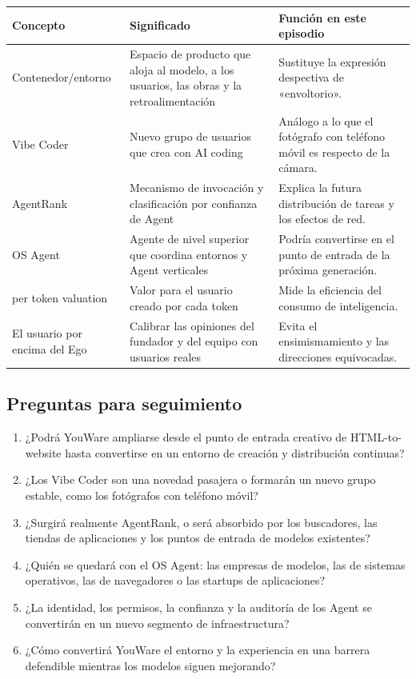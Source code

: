 \noindent\begin{tabularx}{\textwidth}{p{}p{}X}
\toprule
Concepto & Significado & Función en este episodio \\
\midrule
Contenedor/entorno & Espacio de producto que aloja al modelo, a los usuarios, las obras y la retroalimentación & Sustituye la expresión despectiva de «envoltorio». \\
Vibe Coder & Nuevo grupo de usuarios que crea con AI coding & Análogo a lo que el fotógrafo con teléfono móvil es respecto de la cámara. \\
AgentRank & Mecanismo de invocación y clasificación por confianza de Agent & Explica la futura distribución de tareas y los efectos de red. \\
OS Agent & Agente de nivel superior que coordina entornos y Agent verticales & Podría convertirse en el punto de entrada de la próxima generación. \\
per token valuation & Valor para el usuario creado por cada token & Mide la eficiencia del consumo de inteligencia. \\
El usuario por encima del Ego & Calibrar las opiniones del fundador y del equipo con usuarios reales & Evita el ensimismamiento y las direcciones equivocadas. \\
\bottomrule
\end{tabularx}

\subsection{Preguntas para seguimiento}

\begin{enumerate}
\item ¿Podrá YouWare ampliarse desde el punto de entrada creativo de HTML-to-website hasta convertirse en un entorno de creación y distribución continuas?
\item ¿Los Vibe Coder son una novedad pasajera o formarán un nuevo grupo estable, como los fotógrafos con teléfono móvil?
\item ¿Surgirá realmente AgentRank, o será absorbido por los buscadores, las tiendas de aplicaciones y los puntos de entrada de modelos existentes?
\item ¿Quién se quedará con el OS Agent: las empresas de modelos, las de sistemas operativos, las de navegadores o las startups de aplicaciones?
\item ¿La identidad, los permisos, la confianza y la auditoría de los Agent se convertirán en un nuevo segmento de infraestructura?
\item ¿Cómo convertirá YouWare el entorno y la experiencia en una barrera defendible mientras los modelos siguen mejorando?
\end{enumerate}

